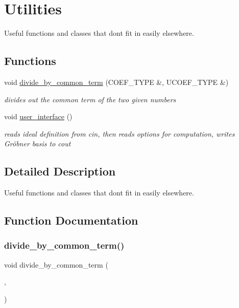 \hypertarget{group__utils}{}\section{Utilities}
\label{group__utils}


Useful functions and classes that don\textquotesingle{}t fit in easily elsewhere.  


\subsection*{Functions}
\begin{DoxyCompactItemize}
\item 
void \hyperlink{group__utils_gaefe33f79de88accbc6f455e91dab9288}{divide\+\_\+by\+\_\+common\+\_\+term} (C\+O\+E\+F\+\_\+\+T\+Y\+PE \&, U\+C\+O\+E\+F\+\_\+\+T\+Y\+PE \&)
\begin{DoxyCompactList}\small\item\em divides out the common term of the two given numbers \end{DoxyCompactList}\item 
void \hyperlink{group__utils_ga72d205e8226d578b892515edc527cc83}{user\+\_\+interface} ()
\begin{DoxyCompactList}\small\item\em reads ideal definition from {\ttfamily cin}, then reads options for computation, writes Gr\"{o}bner basis to {\ttfamily cout} \end{DoxyCompactList}\end{DoxyCompactItemize}


\subsection{Detailed Description}
Useful functions and classes that don\textquotesingle{}t fit in easily elsewhere. 



\subsection{Function Documentation}
\mbox{\label{group__utils_gaefe33f79de88accbc6f455e91dab9288}} 
\subsubsection{\texorpdfstring{divide\+\_\+by\+\_\+common\+\_\+term()}{divide\_by\_common\_term()}}
{\footnotesize\ttfamily void divide\+\_\+by\+\_\+common\+\_\+term (\begin{DoxyParamCaption}\item[{C\+O\+E\+F\+\_\+\+T\+Y\+PE \&}]{,  }\item[{U\+C\+O\+E\+F\+\_\+\+T\+Y\+PE \&}]{ }\end{DoxyParamCaption})}




